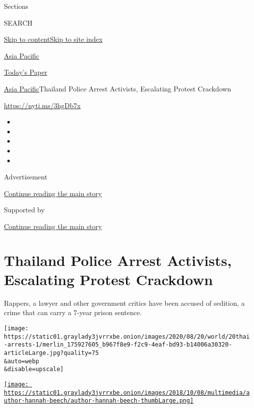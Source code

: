 Sections

SEARCH

\protect\hyperlink{site-content}{Skip to
content}\protect\hyperlink{site-index}{Skip to site index}

\href{https://www.nytimes3xbfgragh.onion/section/world/asia}{Asia
Pacific}

\href{https://myaccount.nytimes3xbfgragh.onion/auth/login?response_type=cookie\&client_id=vi}{}

\href{https://www.nytimes3xbfgragh.onion/section/todayspaper}{Today's
Paper}

\href{/section/world/asia}{Asia Pacific}\textbar{}Thailand Police Arrest
Activists, Escalating Protest Crackdown

\url{https://nyti.ms/3hgDb7x}

\begin{itemize}
\item
\item
\item
\item
\item
\end{itemize}

Advertisement

\protect\hyperlink{after-top}{Continue reading the main story}

Supported by

\protect\hyperlink{after-sponsor}{Continue reading the main story}

\hypertarget{thailand-police-arrest-activists-escalating-protest-crackdown}{%
\section{Thailand Police Arrest Activists, Escalating Protest
Crackdown}\label{thailand-police-arrest-activists-escalating-protest-crackdown}}

Rappers, a lawyer and other government critics have been accused of
sedition, a crime that can carry a 7-year prison sentence.

\texttt{[image: https://static01.graylady3jvrrxbe.onion/images/2020/08/20/world/20thai-arrests-1/merlin\_175927605\_b967f8e9-f2c9-4eaf-bd93-b14006a30320-articleLarge.jpg?quality=75\\\&auto=webp\\\&disable=upscale]}

\href{https://www.nytimes3xbfgragh.onion/by/hannah-beech}{\texttt{[image: https://static01.graylady3jvrrxbe.onion/images/2018/10/08/multimedia/author-hannah-beech/author-hannah-beech-thumbLarge.png]}}

